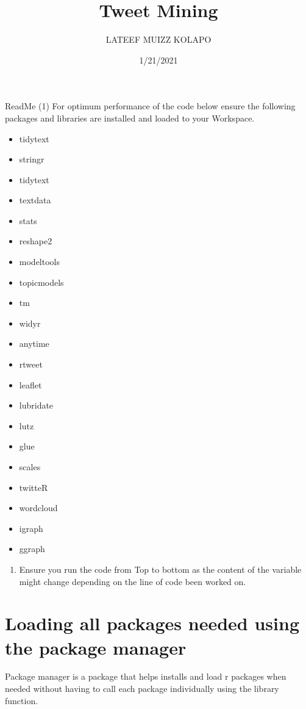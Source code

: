 \documentclass[
]{article}
\title{Tweet Mining}
\author{LATEEF MUIZZ KOLAPO}
\date{1/21/2021}
\providecommand{\tightlist}{%
  \setlength{\itemsep}{0pt}\setlength{\parskip}{0pt}}
\begin{document}
\maketitle

ReadMe (1) For optimum performance of the code below ensure the
following packages and libraries are installed and loaded to your
Workspace.

\begin{itemize}
\tightlist
\item
  tidytext
\item
  stringr
\item
  tidytext
\item
  textdata
\item
  stats
\item
  reshape2
\item
  modeltools
\item
  topicmodels
\item
  tm
\item
  widyr
\item
  anytime
\item
  rtweet
\item
  leaflet
\item
  lubridate
\item
  lutz
\item
  glue
\item
  scales
\item
  twitteR
\item
  wordcloud
\item
  igraph
\item
  ggraph
\end{itemize}

\begin{enumerate}
\def\labelenumi{(\arabic{enumi})}
\setcounter{enumi}{1}
\tightlist
\item
  Ensure you run the code from Top to bottom as the content of the
  variable might change depending on the line of code been worked on.
\end{enumerate}

\hypertarget{loading-all-packages-needed-using-the-package-manager}{%
\section{Loading all packages needed using the package
manager}\label{loading-all-packages-needed-using-the-package-manager}}

Package manager is a package that helps installs and load r packages
when needed without having to call each package individually using the
library function.
\end{document}
